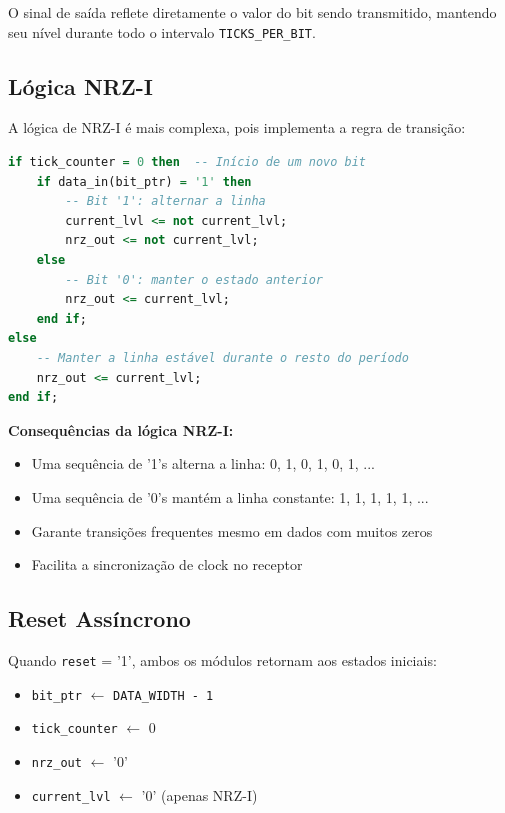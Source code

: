 \documentclass[11pt,a4paper]{article}
\begin{document}
O sinal de saída reflete diretamente o valor do bit sendo transmitido, mantendo seu nível durante todo o intervalo \texttt{TICKS\_PER\_BIT}.

\subsection{Lógica NRZ-I}

A lógica de NRZ-I é mais complexa, pois implementa a regra de transição:

\begin{lstlisting}[language=VHDL]
if tick_counter = 0 then  -- Início de um novo bit
    if data_in(bit_ptr) = '1' then
        -- Bit '1': alternar a linha
        current_lvl <= not current_lvl;
        nrz_out <= not current_lvl;
    else
        -- Bit '0': manter o estado anterior
        nrz_out <= current_lvl;
    end if;
else
    -- Manter a linha estável durante o resto do período
    nrz_out <= current_lvl;
end if;
\end{lstlisting}

\textbf{Consequências da lógica NRZ-I:}

\begin{itemize}
    \item Uma sequência de '1's alterna a linha: 0, 1, 0, 1, 0, 1, ...
    \item Uma sequência de '0's mantém a linha constante: 1, 1, 1, 1, 1, ...
    \item Garante transições frequentes mesmo em dados com muitos zeros
    \item Facilita a sincronização de clock no receptor
\end{itemize}

\subsection{Reset Assíncrono}

Quando \texttt{reset} = '1', ambos os módulos retornam aos estados iniciais:

\begin{itemize}
    \item \texttt{bit\_ptr} $\leftarrow$ \texttt{DATA\_WIDTH - 1}
    \item \texttt{tick\_counter} $\leftarrow$ 0
    \item \texttt{nrz\_out} $\leftarrow$ '0'
    \item \texttt{current\_lvl} $\leftarrow$ '0' (apenas NRZ-I)
\end{itemize}
\end{document}
